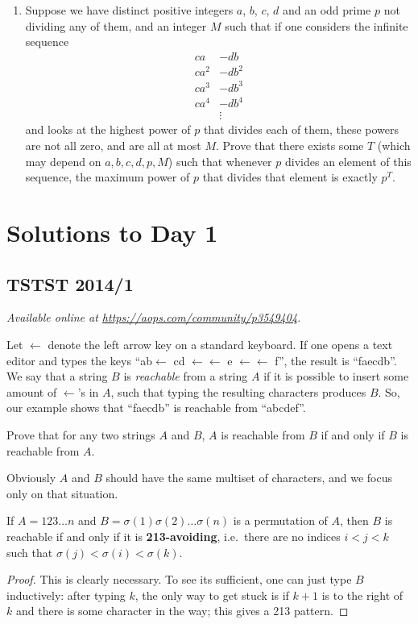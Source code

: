 \documentclass[11pt]{scrartcl}
\begin{document}
\begin{enumerate}[\bfseries 1.]
\item %
Suppose we have distinct positive integers $a$, $b$, $c$, $d$
and an odd prime $p$ not dividing any of them,
and an integer $M$ such that if one considers the infinite sequence
\begin{align*}
  ca &- db \\
  ca^2 &- db^2 \\
  ca^3 &- db^3 \\
  ca^4 &- db^4 \\
  &\vdots
\end{align*}
and looks at the highest power of $p$ that divides each of them,
these powers are not all zero, and are all at most $M$.
Prove that there exists some $T$ (which may depend on $a,b,c,d,p,M$)
such that whenever $p$ divides an element of this sequence,
the maximum power of $p$ that divides that element is exactly $p^T$.

\end{enumerate}
\pagebreak

\section{Solutions to Day 1}
\subsection{TSTST 2014/1}
\textsl{Available online at \url{https://aops.com/community/p3549404}.}
\begin{mdframed}[style=mdpurplebox,frametitle={Problem statement}]
Let $\leftarrow$ denote the left arrow key on a standard keyboard. If
one opens a text editor and types the keys
``ab$\leftarrow$ cd $\leftarrow \leftarrow$ e $\leftarrow \leftarrow$ f'',
the result is ``faecdb''.
We say that a string $B$ is \emph{reachable} from a string $A$ if
it is possible to insert some amount of $\leftarrow$'s in $A$,
such that typing the resulting characters produces $B$.
So, our example shows that ``faecdb'' is reachable from ``abcdef''.

Prove that for any two strings $A$ and $B$,
$A$ is reachable from $B$ if and only if $B$ is reachable from $A$.
\end{mdframed}
Obviously $A$ and $B$ should have the
same multiset of characters, and we focus only on that situation.

\begin{claim*}
  If $A = 123 \dots n$
  and $B = \sigma(1) \sigma(2) \dots \sigma(n)$
  is a permutation of $A$,
  then $B$ is reachable if and only if
  it is \textbf{213-avoiding},
  i.e.\ there are no indices $i < j < k$
  such that $\sigma(j) < \sigma(i) < \sigma(k)$.
\end{claim*}
\begin{proof}
  This is clearly necessary.
  To see its sufficient, one can just type $B$ inductively:
  after typing $k$, the only way to get stuck is if
  $k+1$ is to the right of $k$ and there is some character in the way;
  this gives a 213 pattern.
\end{proof}
\end{document}
